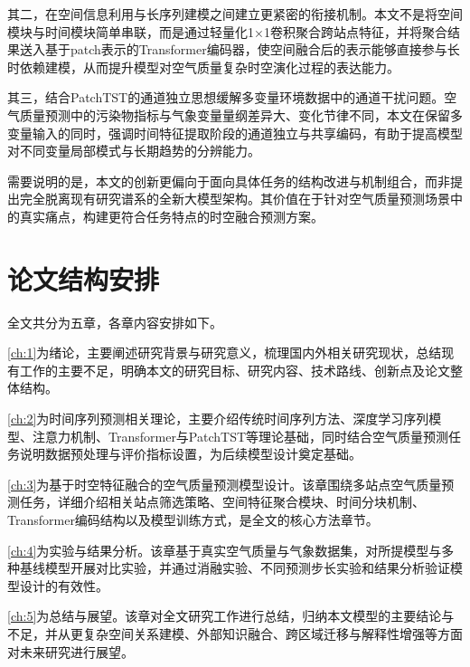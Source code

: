 其二，在空间信息利用与长序列建模之间建立更紧密的衔接机制。本文不是将空间模块与时间模块简单串联，而是通过轻量化1×1卷积聚合跨站点特征，并将聚合结果送入基于patch表示的Transformer编码器，使空间融合后的表示能够直接参与长时依赖建模，从而提升模型对空气质量复杂时空演化过程的表达能力。

其三，结合PatchTST的通道独立思想缓解多变量环境数据中的通道干扰问题。空气质量预测中的污染物指标与气象变量量纲差异大、变化节律不同，本文在保留多变量输入的同时，强调时间特征提取阶段的通道独立与共享编码，有助于提高模型对不同变量局部模式与长期趋势的分辨能力。

需要说明的是，本文的创新更偏向于面向具体任务的结构改进与机制组合，而非提出完全脱离现有研究谱系的全新大模型架构。其价值在于针对空气质量预测场景中的真实痛点，构建更符合任务特点的时空融合预测方案。

\section{论文结构安排}

全文共分为五章，各章内容安排如下。

\cref{ch:1}为绪论，主要阐述研究背景与研究意义，梳理国内外相关研究现状，总结现有工作的主要不足，明确本文的研究目标、研究内容、技术路线、创新点及论文整体结构。

\cref{ch:2}为时间序列预测相关理论，主要介绍传统时间序列方法、深度学习序列模型、注意力机制、Transformer与PatchTST等理论基础，同时结合空气质量预测任务说明数据预处理与评价指标设置，为后续模型设计奠定基础。

\cref{ch:3}为基于时空特征融合的空气质量预测模型设计。该章围绕多站点空气质量预测任务，详细介绍相关站点筛选策略、空间特征聚合模块、时间分块机制、Transformer编码结构以及模型训练方式，是全文的核心方法章节。

\cref{ch:4}为实验与结果分析。该章基于真实空气质量与气象数据集，对所提模型与多种基线模型开展对比实验，并通过消融实验、不同预测步长实验和结果分析验证模型设计的有效性。

\cref{ch:5}为总结与展望。该章对全文研究工作进行总结，归纳本文模型的主要结论与不足，并从更复杂空间关系建模、外部知识融合、跨区域迁移与解释性增强等方面对未来研究进行展望。
